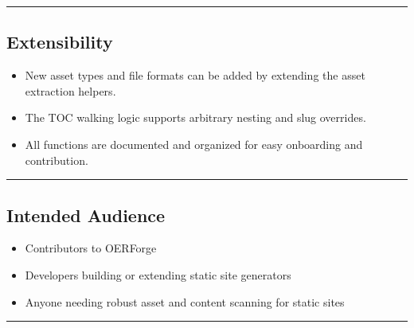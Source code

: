 \begin{center}\rule{0.5\linewidth}{0.5pt}\end{center}

\subsection{Extensibility}\label{extensibility}

\begin{itemize}
\tightlist
\item
  New asset types and file formats can be added by extending the asset
  extraction helpers.
\item
  The TOC walking logic supports arbitrary nesting and slug overrides.
\item
  All functions are documented and organized for easy onboarding and
  contribution.
\end{itemize}

\begin{center}\rule{0.5\linewidth}{0.5pt}\end{center}

\subsection{Intended Audience}\label{intended-audience}

\begin{itemize}
\tightlist
\item
  Contributors to OERForge
\item
  Developers building or extending static site generators
\item
  Anyone needing robust asset and content scanning for static sites
\end{itemize}

\begin{center}\rule{0.5\linewidth}{0.5pt}\end{center}
